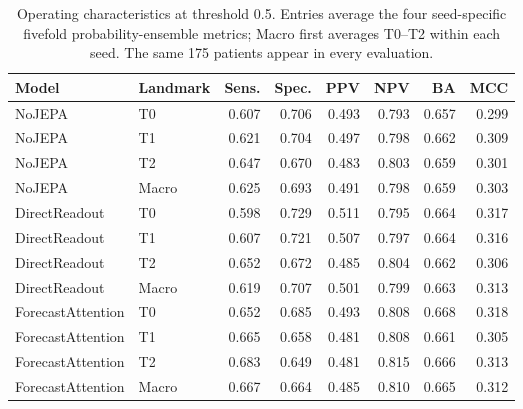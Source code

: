 \begin{table}[t]
\centering
\small
\caption{Operating characteristics at threshold 0.5. Entries average the four seed-specific fivefold probability-ensemble metrics; Macro first averages T0--T2 within each seed. The same 175 patients appear in every evaluation.}
\label{tab:extended_operating}
\begin{tabular}{llrrrrrr}
\toprule
Model & Landmark & Sens. & Spec. & PPV & NPV & BA & MCC \\
\midrule
NoJEPA & T0 & 0.607 & 0.706 & 0.493 & 0.793 & 0.657 & 0.299 \\
NoJEPA & T1 & 0.621 & 0.704 & 0.497 & 0.798 & 0.662 & 0.309 \\
NoJEPA & T2 & 0.647 & 0.670 & 0.483 & 0.803 & 0.659 & 0.301 \\
NoJEPA & Macro & 0.625 & 0.693 & 0.491 & 0.798 & 0.659 & 0.303 \\
\midrule
DirectReadout & T0 & 0.598 & 0.729 & 0.511 & 0.795 & 0.664 & 0.317 \\
DirectReadout & T1 & 0.607 & 0.721 & 0.507 & 0.797 & 0.664 & 0.316 \\
DirectReadout & T2 & 0.652 & 0.672 & 0.485 & 0.804 & 0.662 & 0.306 \\
DirectReadout & Macro & 0.619 & 0.707 & 0.501 & 0.799 & 0.663 & 0.313 \\
\midrule
ForecastAttention & T0 & 0.652 & 0.685 & 0.493 & 0.808 & 0.668 & 0.318 \\
ForecastAttention & T1 & 0.665 & 0.658 & 0.481 & 0.808 & 0.661 & 0.305 \\
ForecastAttention & T2 & 0.683 & 0.649 & 0.481 & 0.815 & 0.666 & 0.313 \\
ForecastAttention & Macro & 0.667 & 0.664 & 0.485 & 0.810 & 0.665 & 0.312 \\
\bottomrule
\end{tabular}
\end{table}
